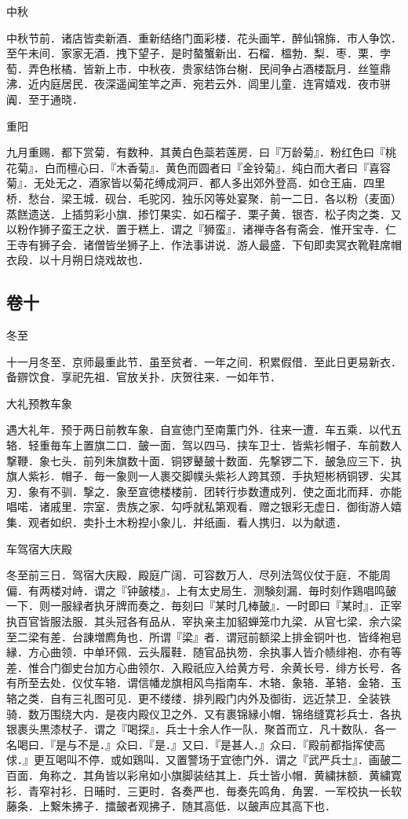 \documentclass[]{article}
\begin{document}
中秋

中秋节前．诸店皆卖新酒．重新结络门面彩楼．花头画竿．醉仙锦旆．市人争饮．至午未间．家家无酒．拽下望子．是时螯蟹新出．石榴．榲勃．梨．枣．栗．孛萄．弄色枨橘．皆新上市．中秋夜．贵家结饰台榭．民间争占酒楼翫月．丝篁鼎沸．近内庭居民．夜深遥闻笙竿之声．宛若云外．闾里儿童．连宵嬉戏．夜市骈阗．至于通晓．

重阳

九月重赐．都下赏菊．有数种．其黄白色蘂若莲房．曰『万龄菊』．粉红色曰『桃花菊』．白而檀心曰．『木香菊』．黄色而圆者曰『金铃菊』．纯白而大者曰『喜容菊』．无处无之．酒家皆以菊花缚成洞戸．都人多出郊外登高．如仓王庙．四里桥．愁台．梁王城．砚台．毛驼冈．独乐冈等处宴聚．前一二日．各以粉（麦面）蒸餻遗送．上插剪彩小旗．掺饤果实．如石榴子．栗子黄．银杏．松子肉之类．又以粉作狮子蛮王之状．置于糕上．谓之『狮蛮』．诸禅寺各有斋会．惟开宝寺．仁王寺有狮子会．诸僧皆坐狮子上．作法事讲说．游人最盛．下旬即卖冥衣靴鞋席帽衣段．以十月朔日烧戏故也．

\hypertarget{header-n175}{%
\subsection{卷十}\label{header-n175}}

冬至

十一月冬至．京师最重此节．虽至贫者．一年之间．积累假借．至此日更易新衣．备辧饮食．享祀先祖．官放关扑．庆贺往来．一如年节．

大礼预教车象

遇大礼年．预于两日前教车象．自宣徳门至南薫门外．往来一遭．车五乘．以代五辂．轻重毎车上置旗二口．皷一面．驾以四马．挟车卫士．皆紫衫帽子．车前数人撃鞭．象七头．前列朱旗数十面．铜锣鼙皷十数面．先撃锣二下．皷急应三下．执旗人紫衫．帽子．毎一象则一人裹交脚幞头紫衫人跨其颈．手执短彬柄铜锣．尖其刃．象有不驯．撃之．象至宣徳楼楼前．团转行歩数遭成列．使之面北而拜．亦能唱喏．诸戚里．宗室．贵族之家．勾呼就私第观看．赠之银彩无虚日．御街游人嬉集．观者如织．卖扑土木粉揑小象儿．并纸画．看人携归．以为献遗．

车驾宿大庆殿

冬至前三日．驾宿大庆殿．殿庭广阔．可容数万人．尽列法驾仪仗于庭．不能周偏．有两楼对峙．谓之『钟皷楼』．上有太史局生．测験刻漏．毎时刻作鶏唱鸣皷一下．则一服緑者执牙牌而奏之．毎刻曰『某时几棒皷』．一时即曰『某时』．正宰执百官皆服法服．其头冠各有品从．宰执亲主加貂蝉笼巾九梁．从官七梁．余六梁至二梁有差．台諌増廌角也．所谓『梁』者．谓冠前额梁上排金铜叶也．皆绛袍皂縁．方心曲领．中单环佩．云头履鞋．随官品执笏．余执事人皆介帻绯袍．亦有等差．惟合门御史台加方心曲领尔．入殿祇应入给黄方号．余黄长号．绯方长号．各有所至去处．仪仗车辂．谓信幡龙旗相风鸟指南车．木辂．象辂．革辂．金辂．玉辂之类．自有三礼图可见．更不缕缕．排列殿门内外及御街．远近禁卫．全装铁骑．数万围绕大内．是夜内殿仪卫之外．又有裹锦縁小帽．锦络缝寛衫兵士．各执银裹头黒漆杖子．谓之『喝探』．兵士十余人作一队．聚首而立．凡十数队．各一名喝曰．『是与不是．』众曰．『是．』又曰．『是甚人．』众曰．『殿前都指挥使高俅．』更互喝叫不停．或如鶏叫．又置警场于宜徳门外．谓之『武严兵士』．画皷二百面．角称之．其角皆以彩帛如小旗脚装结其上．兵士皆小帽．黄繍抹额．黄繍寛衫．青窄衬衫．日晡时．三更时．各奏严也．毎奏先鸣角．角罢．一军校执一长软藤条．上繋朱拂子．擂皷者观拂子．随其高低．以皷声应其高下也．
\end{document}
